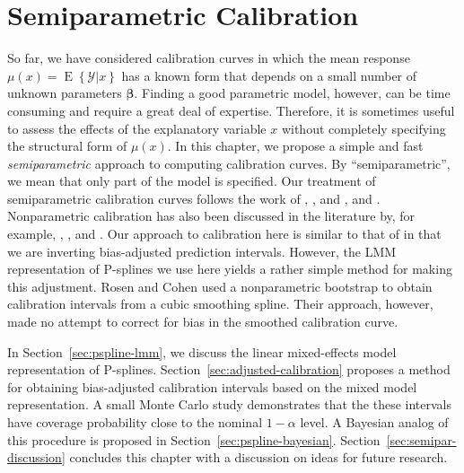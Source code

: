 \documentclass[cmfont,usenames,dvipsnames,leqno]{afit-etd}\usepackage[]{graphicx}\usepackage[]{color}
\newcommand{\mc}[1]{\ensuremath{\mathcal{#1}}}
\newcommand{\E}{\operatorname{E}}
\begin{document}

\chapter{Semiparametric Calibration}
\label{chap:nonparametric}
So far, we have considered calibration curves in which the mean response $\mu(x) = \E\left\{\mc{Y} | x\right\}$ has a known form that depends on a small number of unknown parameters $\bm{\beta}$. Finding a good parametric model, however, can be time consuming and require a great deal of expertise. Therefore, it is sometimes useful to assess the effects of the explanatory variable $x$ without completely specifying the structural form of $\mu(x)$. In this chapter, we propose a simple and fast \textit{semiparametric} approach to computing calibration curves. By ``semiparametric'', we mean that only part of the model is specified. Our treatment of semiparametric calibration curves follows the work of \citet{brumback_comment_1999}, \citet{ruppert_selecting_2002}, and \citet{ruppert_semiparametric_2003}, and \citet{crainiceanu_bayesian_2005}. Nonparametric calibration has also been discussed in the literature by, for example, \citet{clark_calibration_1979}, \citet{clark_calibration_1980}, and \citet{rosen_constructing_1995}. Our approach to calibration here is similar to that of \citet{clark_calibration_1980} in that we are inverting bias-adjusted prediction intervals. However, the \ac{LMM} representation of \ac{P-spline}s \citep{ruppert_semiparametric_2003} we use here yields a rather simple method for making this adjustment. Rosen and Cohen used a nonparametric bootstrap to obtain calibration intervals from a cubic smoothing spline. Their approach, however, made no attempt to correct for bias in the smoothed calibration curve.

In Section~\ref{sec:pspline-lmm}, we discuss the linear mixed-effects model representation of \ac{P-spline}s. Section~\ref{sec:adjusted-calibration} proposes a method for obtaining bias-adjusted calibration intervals based on the mixed model representation. A small Monte Carlo study demonstrates that the these intervals have coverage probability close to the nominal $1-\alpha$ level. A Bayesian analog of this procedure is proposed in Section~\ref{sec:pspline-bayesian}. Section~\ref{sec:semipar-discussion} concludes this chapter with a discussion on ideas for future research.
\end{document}
